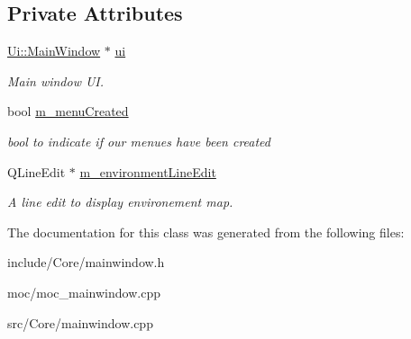 \subsection*{Private Attributes}
\begin{DoxyCompactItemize}
\item 
\hypertarget{class_main_window_a35466a70ed47252a0191168126a352a5}{\hyperlink{class_ui_1_1_main_window}{Ui\-::\-Main\-Window} $\ast$ \hyperlink{class_main_window_a35466a70ed47252a0191168126a352a5}{ui}}\label{class_main_window_a35466a70ed47252a0191168126a352a5}

\begin{DoxyCompactList}\small\item\em Main window U\-I. \end{DoxyCompactList}\item 
\hypertarget{class_main_window_a12d9561bbb394f11186597772d87bef5}{bool \hyperlink{class_main_window_a12d9561bbb394f11186597772d87bef5}{m\-\_\-menu\-Created}}\label{class_main_window_a12d9561bbb394f11186597772d87bef5}

\begin{DoxyCompactList}\small\item\em bool to indicate if our menues have been created \end{DoxyCompactList}\item 
\hypertarget{class_main_window_a048f5126b9a96e5611b520ab3c8bbb55}{Q\-Line\-Edit $\ast$ \hyperlink{class_main_window_a048f5126b9a96e5611b520ab3c8bbb55}{m\-\_\-environment\-Line\-Edit}}\label{class_main_window_a048f5126b9a96e5611b520ab3c8bbb55}

\begin{DoxyCompactList}\small\item\em A line edit to display environement map. \end{DoxyCompactList}\end{DoxyCompactItemize}


The documentation for this class was generated from the following files\-:\begin{DoxyCompactItemize}
\item 
include/\-Core/mainwindow.\-h\item 
moc/moc\-\_\-mainwindow.\-cpp\item 
src/\-Core/mainwindow.\-cpp\end{DoxyCompactItemize}
